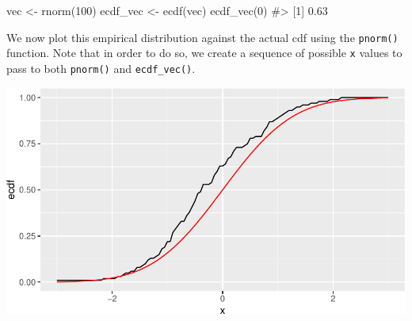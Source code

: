 \documentclass[
  letterpaper,
]{latex/krantz}
\makeatletter
\newenvironment{Shaded}{\begin{snugshade}}{\end{snugshade}}
\newcommand{\AttributeTok}[1]{\textcolor[rgb]{0.40,0.45,0.13}{#1}}
\newcommand{\CommentTok}[1]{\textcolor[rgb]{0.37,0.37,0.37}{#1}}
\newcommand{\DecValTok}[1]{\textcolor[rgb]{0.68,0.00,0.00}{#1}}
\newcommand{\FloatTok}[1]{\textcolor[rgb]{0.68,0.00,0.00}{#1}}
\newcommand{\FunctionTok}[1]{\textcolor[rgb]{0.28,0.35,0.67}{#1}}
\newcommand{\NormalTok}[1]{\textcolor[rgb]{0.00,0.23,0.31}{#1}}
\newcommand{\OtherTok}[1]{\textcolor[rgb]{0.00,0.23,0.31}{#1}}
\newcommand{\SpecialCharTok}[1]{\textcolor[rgb]{0.37,0.37,0.37}{#1}}
\newcommand{\StringTok}[1]{\textcolor[rgb]{0.13,0.47,0.30}{#1}}
\newenvironment{kframe}{%
\medskip{}
\setlength{\fboxsep}{.8em}
 \def\at@end@of@kframe{}%
 \ifinner\ifhmode%
  \def\at@end@of@kframe{\end{minipage}}%
  \begin{minipage}{\columnwidth}%
 \fi\fi%
 \def\FrameCommand##1{\hskip\@totalleftmargin \hskip-\fboxsep
 \colorbox{shadecolor}{##1}\hskip-\fboxsep
     \hskip-\linewidth \hskip-\@totalleftmargin \hskip\columnwidth}%
 \MakeFramed {\advance\hsize-\width
   \@totalleftmargin\z@ \linewidth\hsize
   \@setminipage}}%
 {\par\unskip\endMakeFramed%
 \at@end@of@kframe}
\renewenvironment{Shaded}{\begin{kframe}}{\end{kframe}}
\makeatother
\begin{document}
\begin{Shaded}
\begin{Highlighting}[]
\NormalTok{vec }\OtherTok{\textless{}{-}} \FunctionTok{rnorm}\NormalTok{(}\DecValTok{100}\NormalTok{) }
\NormalTok{ecdf\_vec }\OtherTok{\textless{}{-}} \FunctionTok{ecdf}\NormalTok{(vec)}
\FunctionTok{ecdf\_vec}\NormalTok{(}\DecValTok{0}\NormalTok{)}
\CommentTok{\#\textgreater{} [1] 0.63}
\end{Highlighting}
\end{Shaded}

We now plot this empirical distribution against the actual cdf using the
\texttt{pnorm()} function. Note that in order to do so, we create a
sequence of possible \texttt{x} values to pass to both \texttt{pnorm()}
and \texttt{ecdf\_vec()}.

\begin{Shaded}
\end{Shaded}

\begin{center}
\includegraphics[width=1\textwidth,height=\textheight]{book/distributions_files/figure-pdf/unnamed-chunk-24-1.pdf}
\end{center}
\end{document}
